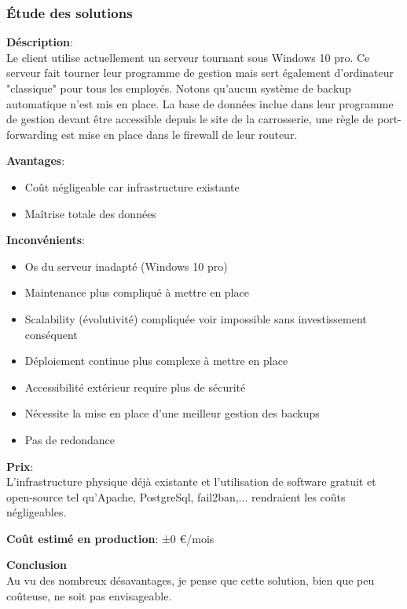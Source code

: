 \newpage
\subsubsection{Étude des solutions}

\textbf{Déscription}: \\ Le client utilise actuellement un serveur tournant sous Windows 10 pro. Ce serveur fait tourner leur programme de gestion mais sert également d'ordinateur "classique" pour tous les employés. Notons qu'aucun système de backup automatique n'est mis en place. La base de données inclue dans leur programme de gestion devant être accessible depuis le site de la carrosserie, une règle de port-forwarding est mise en place dans le firewall de leur routeur.

\newpara
\textbf{Avantages}:
\begin{itemize}
  \item Coût négligeable car infrastructure existante
  \item Maîtrise totale des données
\end{itemize}

\newpara
\textbf{Inconvénients}:
\begin{itemize}
  \item Os du serveur inadapté (Windows 10 pro)
  \item Maintenance plus compliqué à mettre en place
  \item Scalability (évolutivité) compliquée voir impossible sans investissement conséquent
  \item Déploiement continue plus complexe à mettre en place
  \item Accessibilité extérieur require plus de sécurité
  \item Nécessite la mise en place d'une meilleur gestion des backups
  \item Pas de redondance
\end{itemize}

\newpara
\textbf{Prix}: \\ L'infrastructure physique déjà existante et l'utilisation de software gratuit et open-source tel qu'Apache, PostgreSql, fail2ban,... rendraient les coûts négligeables.

\newpara
\textbf{Coût estimé en production}: ±0 €/mois

\newpara
\textbf{Conclusion} \\ Au vu des nombreux désavantages, je pense que cette solution, bien que peu coûteuse, ne soit pas envisageable.

